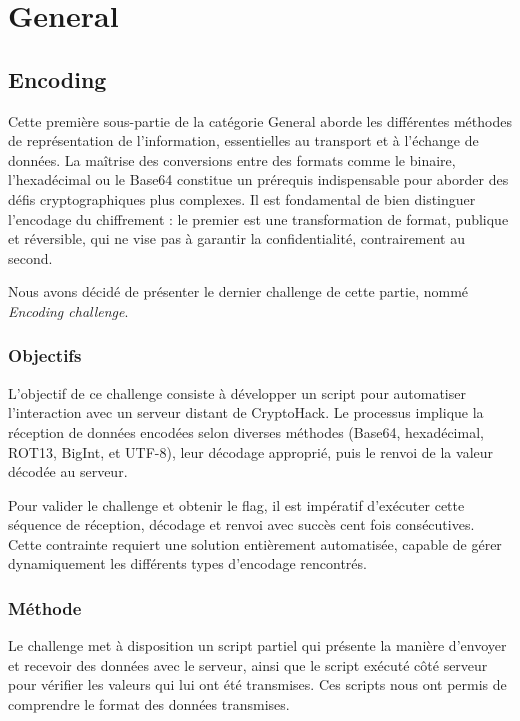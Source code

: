 \section{General}


\subsection{Encoding}

Cette première sous-partie de la catégorie General aborde les différentes
méthodes de représentation de l'information, essentielles au transport
et à l'échange de données. La maîtrise des conversions entre des formats
comme le binaire, l'hexadécimal ou le Base64 constitue un prérequis
indispensable pour aborder des défis cryptographiques plus complexes. Il
est fondamental de bien distinguer l'encodage du chiffrement : le premier
est une transformation de format, publique et réversible, qui ne vise pas
à garantir la confidentialité, contrairement au second.

Nous avons décidé de présenter le dernier challenge de cette partie,
nommé \textit{Encoding challenge}.

\subsubsection{Objectifs}
L'objectif de ce challenge consiste à développer un script pour
automatiser l'interaction avec un serveur distant de CryptoHack. Le
processus implique la réception de données encodées selon diverses
méthodes (Base64, hexadécimal, ROT13, BigInt, et UTF-8), leur décodage
approprié, puis le renvoi de la valeur décodée au serveur.

Pour valider le challenge et obtenir le flag, il est impératif d'exécuter
cette séquence de réception, décodage et renvoi avec succès cent fois
consécutives. Cette contrainte requiert une solution entièrement
automatisée, capable de gérer dynamiquement les différents types
d'encodage rencontrés.

\subsubsection{Méthode}
Le challenge met à disposition un script partiel qui présente la manière
d'envoyer et recevoir des données avec le serveur, ainsi que le script
exécuté côté serveur pour vérifier les valeurs qui lui ont été
transmises. Ces scripts nous ont permis de comprendre le format des
données transmises.

